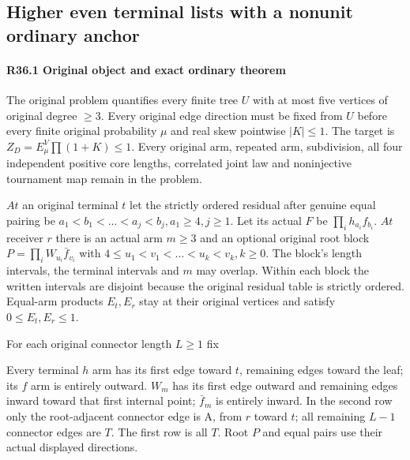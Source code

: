 \subsection{Higher even terminal lists with a nonunit ordinary anchor}\label{proof:R2-C036}

\paragraph{R36.1 Original object and exact ordinary theorem}

The original problem quantifies every finite tree \(U\) with at most five vertices of original degree \(\ge 3\). Every original edge direction must be fixed from \(U\) before every finite original probability \(\mu\) and real skew pointwise \(\lvert K\rvert \le 1\). The target is \(Z_D=E_\mu^V \prod(1+K)\le 1\). Every original arm, repeated arm, subdivision, all four independent positive core lengths, correlated joint law and noninjective tournament map remain in the problem.

\(At\) an original terminal \(t\) let the strictly ordered residual after genuine equal pairing be \(a_{1}<b_{1}<\ldots<a_{j}<b_{j},\allowbreak \allowbreak  a_{1}\ge 4,\allowbreak \allowbreak j\ge 1\). Let its actual \(F\) be \(\prod_i h_{a_{i}} f_{b_{i}}\). \(At\) receiver \(r\) there is an actual arm \(m\ge 3\) and an optional original root block \(P=\prod_i W_{u_{i}} \bar f_{v_{i}}\) with \(4\le u_{1}<v_{1}<\ldots<u_{k}<v_{k},\allowbreak \allowbreak k\ge 0\). The block's length intervals, the terminal intervals and $m$ may overlap. Within each block the written intervals are disjoint because the original residual table is strictly ordered. Equal-arm products \(E_t,\allowbreak \allowbreak E_r\) stay at their original vertices and satisfy \(0\le E_t,\allowbreak \allowbreak E_r\le 1\).

For each original connector length \(L\ge 1\) fix


Every terminal \(h\) arm has its first edge toward \(t\), remaining edges toward the leaf; its \(f\) arm is entirely outward. \(W_m\) has its first edge outward and remaining edges inward toward that first internal point; \(\bar f_m\) is entirely inward. In the second row only the root-adjacent connector edge is A, from \(r\) toward \(t\); all remaining \(L-1\) connector edges are \(T\). The first row is all \(T\). Root \(P\) and equal pairs use their actual displayed directions.

